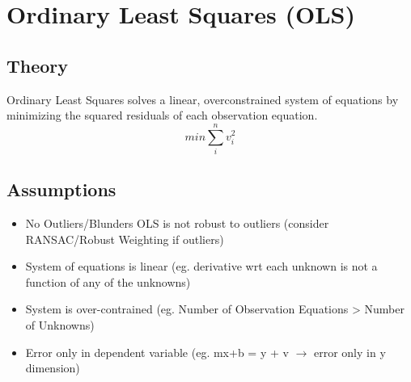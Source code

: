 \section{Ordinary Least Squares (OLS)}
\subsection{Theory}
Ordinary Least Squares solves a linear, overconstrained system of equations by minimizing the squared residuals of each observation equation.
\[
min \sum_{i}^{n} v_i^2
\]

\subsection{Assumptions}
\begin{itemize}
	\item No Outliers/Blunders OLS is not robust to outliers (consider RANSAC/Robust Weighting if outliers)
	\item System of equations is linear (eg. derivative wrt each unknown is not a function of any of the unknowns)
	\item System is over-contrained (eg. Number of Observation Equations > Number of Unknowns)
	\item Error only in dependent variable (eg. mx+b = y + v $\rightarrow$ error only in y dimension)
\end{itemize}
